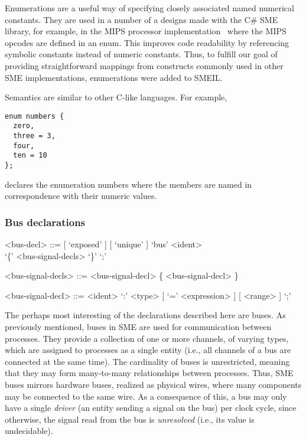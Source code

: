 Enumerations are a useful way of specifying closely associated named numerical
constants. They are used in a number of a designs made with the C\# SME library,
for example, in the MIPS processor implementation~\cite{johnsen2017thesis} where
the MIPS opcodes are defined in an {\ttfamily enum}. This improves code
readability by referencing symbolic constants instead of numeric
constants. Thus, to fulfill our goal of providing straightforward mappings from
constructs commonly used in other SME implementations, enumerations were added
to SMEIL.

Semantics are similar to other C-like languages. For example,
\begin{lstlisting}[language=smeil]
enum numbers {
  zero,
  three = 3,
  four,
  ten = 10
};
\end{lstlisting}
declares the enumeration {\ttfamily numbers} where the members are named in
correspondence with their numeric values.


\subsubsection{Bus declarations}

\begin{grammar}
<bus-decl> ::= [ `exposed' ] [ `unique' ] `bus' <ident> \\ `\{' <bus-signal-decls> `\}'  `;'

<bus-signal-decls> ::= <bus-signal-decl> \{ <bus-signal-decl> \}

<bus-signal-decl> ::= <ident> `:' <type> [ `=' <expression> ] [ <range> ] `;'
\end{grammar}

The perhaps most interesting of the declarations described here are buses. As
previously mentioned, buses in SME are used for communication between
processes. They provide a collection of one or more channels, of varying types,
which are assigned to processes as a single entity (i.e., all channels of a bus
are connected at the same time). The cardinality of buses is unrestricted,
meaning that they may form many-to-many relationships between processes. Thus,
SME buses mirrors hardware buses, realized as physical wires, where many
components may be connected to the same wire. As a consequence of this, a bus
may only have a single {\itshape driver} (an entity sending a signal on the bus)
per clock cycle, since otherwise, the signal read from the bus is {\itshape
  unresolved} (i.e., its value is undecidable).

